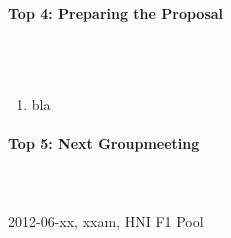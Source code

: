 \documentclass{scrartcl}
\begin{document}
\paragraph{Top 4: Preparing the Proposal}
\hfill \\ \hfill \\
\begin {enumerate}
\item bla
\end {enumerate}

\paragraph{Top 5: Next Groupmeeting}
\hfill \\ \hfill \\
2012-06-xx, xxam, HNI F1 Pool
\end{document}
